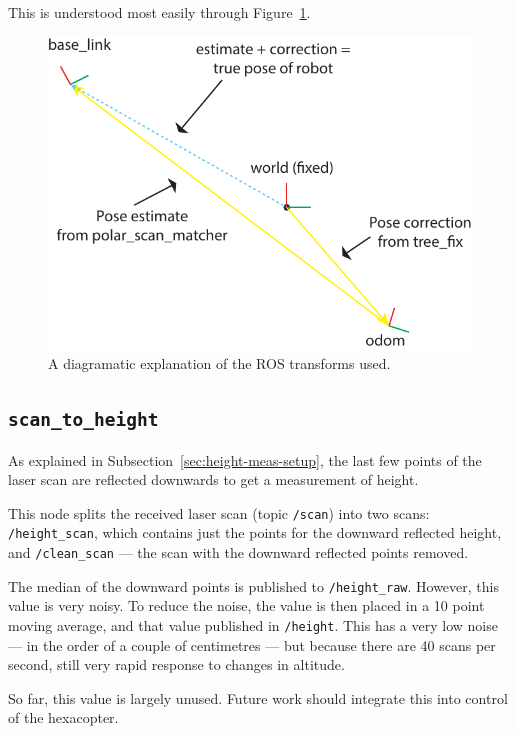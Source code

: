 \documentclass[12pt,oneside,a4paper]{book}
\begin{document}
This is understood most easily through Figure~\ref{fig:rostf}.

\begin{figure}[h!]
  \centering
  \includegraphics[width=\textwidth]{figs/rostf}
  \caption{A diagramatic explanation of the ROS transforms used.}
  \label{fig:rostf}
\end{figure}

\newpage
\subsection{\texttt{scan\_to\_height}}
\label{sec:scan_to_height}

As explained in Subsection~\ref{sec:height-meas-setup}, the last few
points of the laser scan are reflected downwards to get a measurement
of height.

This node splits the received laser scan (topic \texttt{/scan}) into
two scans: \texttt{/height\_scan}, which contains just the points for
the downward reflected height, and \texttt{/clean\_scan} --- the scan
with the downward reflected points removed.

The median of the downward points is published to
\texttt{/height\_raw}. However, this value is very noisy. To reduce
the noise, the value is then placed in a 10 point moving average, and
that value published in \texttt{/height}. This has a very low noise
--- in the order of a couple of centimetres --- but because there are
40 scans per second, still very rapid response to changes in altitude.

So far, this value is largely unused. Future work should integrate
this into control of the hexacopter.
\end{document}
